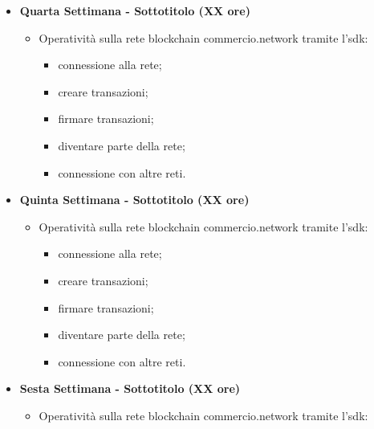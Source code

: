 {\begin{itemize}
\begin{itemize}
\begin{itemize}
            	\item creare transazioni;
            	\item firmare transazioni;
            	\item diventare parte della rete;
            	\item connessione con altre reti.
            \end{itemize}
        \end{itemize}
        \item \textbf{Quarta Settimana - Sottotitolo (XX ore)} 
        \begin{itemize}
            \item Operatività sulla rete blockchain commercio.network tramite l'sdk:
            \begin{itemize}
            	\item connessione alla rete;
            	\item creare transazioni;
            	\item firmare transazioni;
            	\item diventare parte della rete;
            	\item connessione con altre reti.
            \end{itemize}
        \end{itemize}
        \item \textbf{Quinta Settimana - Sottotitolo (XX ore)} 
        \begin{itemize}
            \item Operatività sulla rete blockchain commercio.network tramite l'sdk:
            \begin{itemize}
            	\item connessione alla rete;
            	\item creare transazioni;
            	\item firmare transazioni;
            	\item diventare parte della rete;
            	\item connessione con altre reti.
            \end{itemize}
        \end{itemize}
        \item \textbf{Sesta Settimana - Sottotitolo (XX ore)} 
        \begin{itemize}
            \item Operatività sulla rete blockchain commercio.network tramite l'sdk:
            \begin{itemize}

\end{itemize}
\end{itemize}
\end{itemize}}
